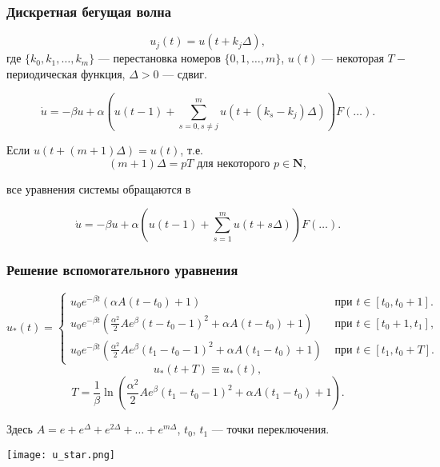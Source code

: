 \begin{frame}
	\frametitle{Дискретная бегущая волна}
	
	\begin{equation}
		\label{eq:discrete_wave}
		u_j(t) = u(t + k_j\Delta),   
	\end{equation}
	где $\{k_0, k_1, \ldots, k_m\}$ --- перестановка номеров $\{0, 1, \ldots, m\}$, $u(t)$ --- некоторая $T-$периодическая функция, $\Delta > 0$ --- сдвиг.
	
	\small
	\begin{equation}
		\label{eq:mg_relay_0}
		\dot{u} = -\beta u+\alpha\left(u(t-1)+ \sum_{s=0,s\neq j}^{m}u(t+(k_s-k_j)\Delta)\right)F\left(\dots\right).
	\end{equation}
	\normalsize
	
	Если $u(t + (m + 1)\Delta) = u(t)$, т.е. 
	\[(m + 1)\Delta = pT \text{ для некоторого } p \in \mathbf{N},\]
	
	все уравнения системы обращаются в
	
	\small
	\begin{equation}
		\label{eq:mg_relay_0}
		\dot{u} = -\beta u+\alpha\left(u(t - 1) + \sum_{s=1}^{m}u(t + s\Delta)\right)F\left(\dots\right).
	\end{equation}
	\normalsize
	
	
\end{frame}

\begin{frame}
	\frametitle{Решение вспомогательного уравнения}
	\small
	\begin{equation*}
		\label{eq:u_star}
		u_*(t)=
		\begin{cases}
			u_0 e^{-\beta t}(\alpha A(t-t_0)+1) & \text{ при } t\in[t_0,t_0+1].
			\\
			u_0 e^{-\beta t}\left(\frac{\alpha^2}{2}Ae^{\beta}(t-t_0-1)^2+\alpha A(t-t_0)+1\right) & \text{ при } t\in[t_0+1,t_1],
			\\
			u_0 e^{-\beta t}\left(\frac{\alpha^2}{2}Ae^{\beta}(t_1-t_0-1)^2+\alpha A(t_1-t_0)+1\right) & \text{ при } t\in[t_1,t_0+T].
		\end{cases}
	\end{equation*}
	\normalsize
	\[
	u_*(t+T)\equiv u_*(t),
	\]
	\begin{equation*}
		\label{eq:mg_period_T}
		T = \dfrac{1}{\beta}\ln\left( \frac{\alpha^2}{2}Ae^{\beta}(t_1-t_0-1)^2+\alpha A(t_1-t_0)+1\right). 
	\end{equation*}
	
	Здесь $A = e + e^{\Delta} + e^{2\Delta} + \ldots + e^{m\Delta}$, $t_0$, $t_1$ --- точки переключения.
	
	\begin{center}
		\texttt{[image: u\_star.png]}
	
	\end{center}
\end{frame}

